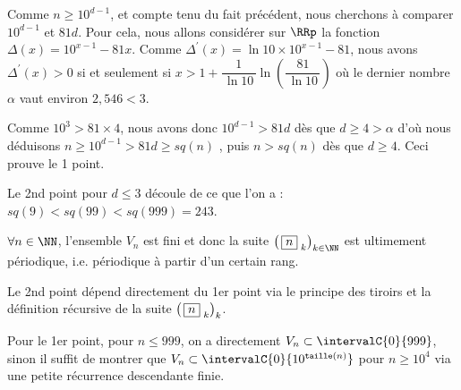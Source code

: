 \begin{proof*}
	Comme $n \geqslant 10^{d-1}$, et compte tenu du fait précédent, nous cherchons à comparer $10^{d-1}$ et $81d$.
	Pour cela, nous allons considérer sur $\RRp$ la fonction $\Delta(x) = 10^{x-1} - 81x$. 
	Comme $\Delta^\prime(x) = \ln 10 \times 10^{x-1} - 81$,
	nous avons $\Delta^\prime(x) > 0$ 
	si et seulement si $x > 1 + \dfrac{1}{\, \ln 10 \,} \ln \left( \dfrac{81}{\, \ln 10 \,} \right)$
	où le dernier nombre $\alpha$ vaut environ $2,\!546 < 3$.


	\medskip
	
	Comme $10^3 > 81 \times 4$, nous avons donc  $10^{d-1} > 81d$ dès que $d \geqslant 4 > \alpha$
	d'où nous déduisons $n \geqslant 10^{d-1} > 81d \geqslant sq(n)$ ,
	puis $n > sq(n)$ dès que $d \geqslant 4$. Ceci prouve le 1\ier{} point.


	\bigskip
	
	Le 2nd point pour $d \leqslant 3$ découle de ce que l'on a : $sq(9) < sq(99) < sq(999) = 243$.
\end{proof*}




\medskip

\begin{fact}
	$\forall n \in \NN$, l'ensemble $V_n$ est fini et donc la suite $\left( \, \sqseq{n}{k} \right)_{k \in \NN}$ est ultimement périodique, i.e. périodique à partir d'un certain rang.
\end{fact}

\begin{proof*}
	Le 2nd point dépend directement du 1er point via le principe des tiroirs et la définition récursive de la suite $\left( \, \fbox{$n$}_{\,\,k} \right)_k$.
	
	\medskip
	
	Pour le 1er point, pour $n \leqslant 999$, on a directement $V_n \subset \intervalC{0}{999}$,
	sinon il suffit de montrer que $V_n \subset \intervalC{0}{10^{\taille(n)}}$ pour $n \geqslant 10^4$ via une petite récurrence descendante finie.
\end{proof*}